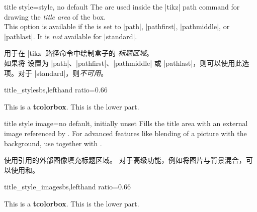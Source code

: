\begin{docTcbKey}{title style}{=}{style, no default}
The  are used inside the |tikz| path command
for drawing the \emph{title area} of the box.\\
This option is available if the  is set to
|path|, |pathfirst|, |pathmiddle|, or |pathlast|.
It is \emph{not} available for |standard|.

 用于在 |tikz| 路径命令中绘制盒子的 \emph{标题区域}。\\ 如果将  设置为 |path|、|pathfirst|、|pathmiddle| 或 |pathlast|，则可以使用此选项。对于 |standard|，则\emph{不可用}。
\begin{exdispExample*}{title_style}{sbs,lefthand ratio=0.66}

\begin{tcolorbox}[enhanced,title=My title,
title style={left color=blue!15!yellow,
              right color=red!85!black}]
This is a \textbf{tcolorbox}.
\tcblower
This is the lower part.
\end{tcolorbox}
\end{exdispExample*}
\end{docTcbKey}

\begin{docTcbKey}{title style image}{=}{no default, initially unset}
Fills the title area with an external image referenced by .
For advanced features like blending of a picture with the background,
use  together with .

使用引用的外部图像填充标题区域。 对于高级功能，例如将图片与背景混合，可以使用和。
\begin{exdispExample*}{title_style_image}{sbs,lefthand ratio=0.66}

\begin{tcolorbox}[enhanced,title=My title,
title style image=blueshade.png]
This is a \textbf{tcolorbox}.
\tcblower
This is the lower part.
\end{tcolorbox}
\end{exdispExample*}
\end{docTcbKey}